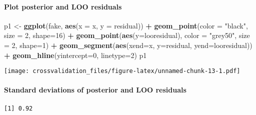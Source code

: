 \documentclass[
]{article}
\newenvironment{Shaded}{\begin{snugshade}}{\end{snugshade}}
\newcommand{\DataTypeTok}[1]{\textcolor[rgb]{0.13,0.29,0.53}{#1}}
\newcommand{\DecValTok}[1]{\textcolor[rgb]{0.00,0.00,0.81}{#1}}
\newcommand{\KeywordTok}[1]{\textcolor[rgb]{0.13,0.29,0.53}{\textbf{#1}}}
\newcommand{\NormalTok}[1]{#1}
\newcommand{\OperatorTok}[1]{\textcolor[rgb]{0.81,0.36,0.00}{\textbf{#1}}}
\newcommand{\StringTok}[1]{\textcolor[rgb]{0.31,0.60,0.02}{#1}}
\begin{document}
\hypertarget{plot-posterior-and-loo-residuals}{%
\paragraph{Plot posterior and LOO
residuals}\label{plot-posterior-and-loo-residuals}}

\begin{Shaded}
\begin{Highlighting}[]
\NormalTok{p1 <-}\StringTok{ }\KeywordTok{ggplot}\NormalTok{(fake, }\KeywordTok{aes}\NormalTok{(}\DataTypeTok{x =}\NormalTok{ x, }\DataTypeTok{y =}\NormalTok{ residual)) }\OperatorTok{+}
\StringTok{  }\KeywordTok{geom_point}\NormalTok{(}\DataTypeTok{color =} \StringTok{"black"}\NormalTok{, }\DataTypeTok{size =} \DecValTok{2}\NormalTok{, }\DataTypeTok{shape=}\DecValTok{16}\NormalTok{) }\OperatorTok{+}
\StringTok{  }\KeywordTok{geom_point}\NormalTok{(}\KeywordTok{aes}\NormalTok{(}\DataTypeTok{y=}\NormalTok{looresidual), }\DataTypeTok{color =} \StringTok{"grey50"}\NormalTok{, }\DataTypeTok{size =} \DecValTok{2}\NormalTok{, }\DataTypeTok{shape=}\DecValTok{1}\NormalTok{) }\OperatorTok{+}
\StringTok{  }\KeywordTok{geom_segment}\NormalTok{(}\KeywordTok{aes}\NormalTok{(}\DataTypeTok{xend=}\NormalTok{x, }\DataTypeTok{y=}\NormalTok{residual, }\DataTypeTok{yend=}\NormalTok{looresidual)) }\OperatorTok{+}
\StringTok{  }\KeywordTok{geom_hline}\NormalTok{(}\DataTypeTok{yintercept=}\DecValTok{0}\NormalTok{, }\DataTypeTok{linetype=}\DecValTok{2}\NormalTok{)}
\NormalTok{p1}
\end{Highlighting}
\end{Shaded}

\texttt{[image: crossvalidation\_files/figure-latex/unnamed-chunk-13-1.pdf]}

\hypertarget{standard-deviations-of-posterior-and-loo-residuals}{%
\paragraph{Standard deviations of posterior and LOO
residuals}\label{standard-deviations-of-posterior-and-loo-residuals}}

\begin{Shaded}
\end{Shaded}

\begin{verbatim}
[1] 0.92
\end{verbatim}
\end{document}
